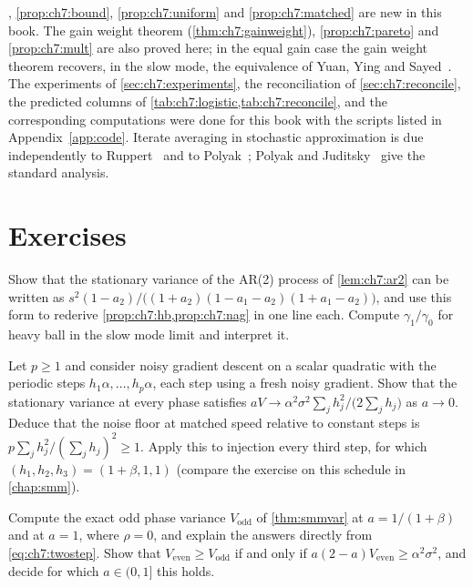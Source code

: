 , \cref{prop:ch7:bound}, \cref{prop:ch7:uniform} and
\cref{prop:ch7:matched} are new in this book.
The gain weight theorem (\cref{thm:ch7:gainweight}), \cref{prop:ch7:pareto} and \cref{prop:ch7:mult} are also proved here; in the equal gain case the gain weight theorem recovers, in the slow mode, the equivalence of Yuan, Ying and Sayed~\cite{yuan2016}.
The experiments of \cref{sec:ch7:experiments}, the reconciliation of \cref{sec:ch7:reconcile}, the predicted columns of \cref{tab:ch7:logistic,tab:ch7:reconcile}, and the corresponding computations were done for this book with the scripts listed in Appendix~\ref{app:code}.
Iterate averaging in stochastic approximation is due independently to Ruppert~\cite{ruppert1988} and to Polyak~\cite{polyak1990}; Polyak and Juditsky~\cite{polyak1992} give the standard analysis.

\section*{Exercises}

\begin{exercise}
Show that the stationary variance of the AR(2) process of \cref{lem:ch7:ar2} can
be written as $s^2(1-a_2)/\bigl((1+a_2)(1-a_1-a_2)(1+a_1-a_2)\bigr)$, and use this
form to rederive \cref{prop:ch7:hb,prop:ch7:nag} in one line each. Compute
$\gamma_1/\gamma_0$ for heavy ball in the slow mode limit and interpret it.
\end{exercise}

\begin{exercise}
Let $p\ge1$ and consider noisy gradient descent on a scalar quadratic with the
periodic steps $h_1\alpha,\dots,h_p\alpha$, each step using a fresh noisy
gradient. Show that the stationary variance at every phase satisfies
$aV\to\alpha^2\sigma^2\sum_jh_j^2/\bigl(2\sum_jh_j\bigr)$ as $a\to0$. Deduce
that the noise floor at matched speed relative to constant steps is
$p\sum_jh_j^2/(\sum_jh_j)^2\ge1$. Apply this to injection every third step, for
which $(h_1,h_2,h_3)=(1+\beta,1,1)$ (compare the exercise on this schedule in
\cref{chap:smm}).
\end{exercise}

\begin{exercise}
Compute the exact odd phase variance $V_{\mathrm{odd}}$ of \cref{thm:smmvar} at
$a=1/(1+\beta)$ and at $a=1$, where $\rho=0$, and explain the answers directly
from \eqref{eq:ch7:twostep}. Show that $V_{\mathrm{even}}\ge V_{\mathrm{odd}}$
if and only if $a(2-a)V_{\mathrm{even}}\ge\alpha^2\sigma^2$, and decide for which
$a\in(0,1]$ this holds.
\end{exercise}

